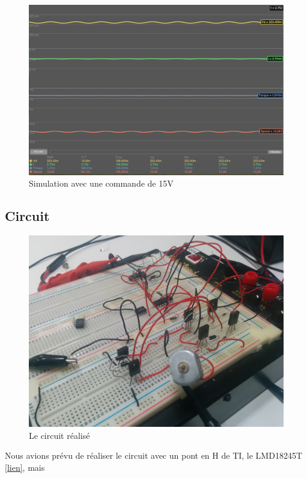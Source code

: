 \documentclass[a4paper]{article}
\begin{document}
\begin{figure}
	\centering
	\includegraphics[width=1\textwidth]{simu15v}
	\caption{Simulation avec une commande de 15V}
\end{figure}

\newpage

\subsection{Circuit}

\begin{figure}[h!]
  \centering
    \includegraphics[width=1\textwidth]{circuit}
  \caption{Le circuit réalisé}
\end{figure}

Nous avions prévu de réaliser le circuit avec un pont en H de TI, le LMD18245T \href{http://www.ti.com/lit/ds/symlink/lmd18245.pdf}{[lien]}, mais 
\end{document}
